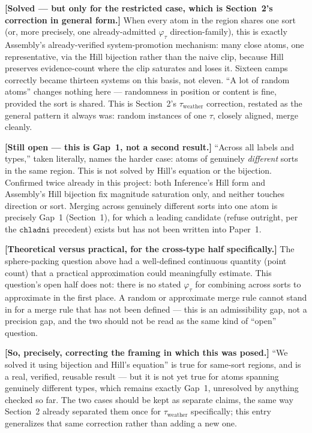 \documentclass[11pt]{article}
\begin{document}
\textbf{[Solved --- but only for the restricted case, which is
Section~2's correction in general form.]} When every atom in the
region shares one sort (or, more precisely, one already-admitted
$\varphi_\tau$ direction-family), this is exactly
Assembly's already-verified system-promotion mechanism: many close
atoms, one representative, via the Hill bijection rather than the
naive clip, because Hill preserves evidence-count where the clip
saturates and loses it. Sixteen camps correctly became thirteen
systems on this basis, not eleven. ``A lot of random atoms'' changes
nothing here --- randomness in position or content is fine, provided
the sort is shared. This is Section~2's $\tau_{\text{weather}}$
correction, restated as the general pattern it always was: random
instances of one $\tau$, closely aligned, merge cleanly.

\textbf{[Still open --- this is Gap~1, not a second result.]} ``Across
all labels and types,'' taken literally, names the harder case: atoms
of genuinely \emph{different} sorts in the same region. This is not
solved by Hill's equation or the bijection. Confirmed twice already
in this project: both Inference's Hill form and Assembly's Hill
bijection fix magnitude saturation only, and neither touches direction
or sort. Merging across genuinely different sorts into one atom is
precisely Gap~1 (Section~1), for which a leading candidate (refuse
outright, per the $\mathtt{chladni}$ precedent) exists but has not
been written into Paper~1.

\textbf{[Theoretical versus practical, for the cross-type half
specifically.]} The sphere-packing question above had a well-defined
continuous quantity (point count) that a practical approximation could
meaningfully estimate. This question's open half does not: there is no
stated $\varphi_\tau$ for combining across sorts to approximate in the
first place. A random or approximate merge rule cannot stand in for a
merge rule that has not been defined --- this is an admissibility gap,
not a precision gap, and the two should not be read as the same kind
of ``open'' question.

\textbf{[So, precisely, correcting the framing in which this was
posed.]} ``We solved it using bijection and Hill's equation'' is true
for same-sort regions, and is a real, verified, reusable result ---
but it is not yet true for atoms spanning genuinely different types,
which remains exactly Gap~1, unresolved by anything checked so far.
The two cases should be kept as separate claims, the same way
Section~2 already separated them once for $\tau_{\text{weather}}$
specifically; this entry generalizes that same correction rather than
adding a new one.
\end{document}
